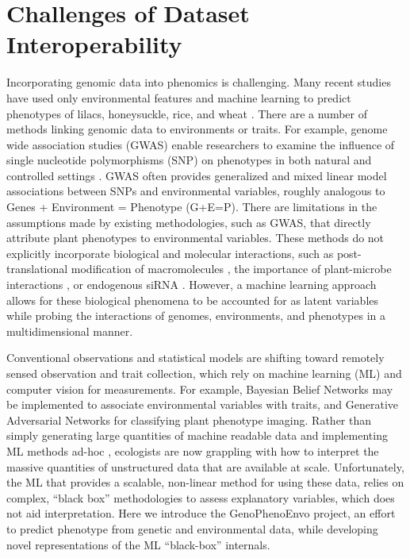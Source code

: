 \documentclass[11pt,]{article}
\begin{document}
\hypertarget{challenges-of-dataset-interoperability}{%
\section{Challenges of Dataset
Interoperability}\label{challenges-of-dataset-interoperability}}

Incorporating genomic data into phenomics is challenging. Many recent
studies have used only environmental features and machine learning to
predict phenotypes of lilacs, honeysuckle, rice, and wheat
\citep{ALDERMAN20171, nissanka2015calibration, mehdipoor2019geocomputational}.
There are a number of methods linking genomic data to environments or
traits. For example, genome wide association studies (GWAS) enable
researchers to examine the influence of single nucleotide polymorphisms
(SNP) on phenotypes in both natural and controlled settings
\citep{beyer2019loci, schlappi2017assessment, spindel2016genome}. GWAS
often provides generalized and mixed linear model associations between
SNPs and environmental variables, roughly analogous to Genes +
Environment = Phenotype (G+E=P). There are limitations in the
assumptions made by existing methodologies, such as GWAS, that directly
attribute plant phenotypes to environmental variables. These methods do
not explicitly incorporate biological and molecular interactions, such
as post-translational modification of macromolecules
\citep{running2014role}, the importance of plant-microbe interactions
\citep{oyserman2019extracting}, or endogenous siRNA
\citep{katiyar2006pathogen}. However, a machine learning approach allows
for these biological phenomena to be accounted for as latent variables
while probing the interactions of genomes, environments, and phenotypes
in a multidimensional manner.

Conventional observations and statistical models are shifting toward
remotely sensed observation and trait collection, which rely on machine
learning (ML) and computer vision for measurements. For example,
Bayesian Belief Networks \citep{cooper1990computational} may be
implemented to associate environmental variables with traits, and
Generative Adversarial Networks \citep{radford2015unsupervised} for
classifying plant phenotype imaging. Rather than simply generating large
quantities of machine readable data \citep{hampton2013big} and
implementing ML methods ad-hoc \citep{pichler2020machine}, ecologists
are now grappling with how to interpret the massive quantities of
unstructured data that are available at scale. Unfortunately, the ML
that provides a scalable, non-linear method for using these data, relies
on complex, ``black box'' methodologies to assess explanatory variables,
which does not aid interpretation. Here we introduce the GenoPhenoEnvo
project, an effort to predict phenotype from genetic and environmental
data, while developing novel representations of the ML ``black-box''
internals.
\end{document}
